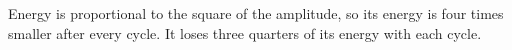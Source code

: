 Energy is proportional to the square of the amplitude, so its energy
is four times smaller after every cycle. It loses three quarters of
its energy with each cycle.



